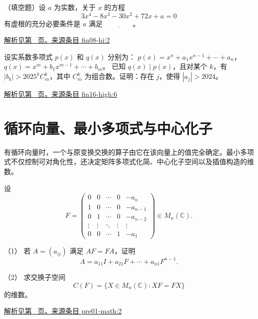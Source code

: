 \documentclass[UTF8,12pt,a4paper,fontset=fandol]{ctexart}
\begin{document}
\begin{example}\label{ex:fin08-hi:2}

（填空题）设 $a$ 为实数，关于 $x$ 的方程
\[
3x^{4}-8x^{3}-30x^{2}+72x+a=0
\]
有虚根的充分必要条件是 $a$ 满足 $\underline{\qquad\qquad}$。

\par\hyperref[ans:fin08-hi:2]{解析见第~\pageref{ans:fin08-hi:2} 页。}\quad\href{https://github.com/lzxcr/cmc-mathematics/blob/64916fa1fdbc3e444a652eca204d5669058ee321/src/problems/finals/08/02.md}{来源条目 fin08-hi:2}

\end{example}

\begin{example}\label{ex:fin16-high:6}

设实系数多项式 $p(x)$ 和 $q(x)$ 分别为：
$p(x) = x^n + a_1 x^{n-1} + \cdots + a_n$，$q(x) = x^m + b_1 x^{m-1} + \cdots + b_m$。
已知 $q(x) \mid p(x)$，且对某个 $k$，有 $|b_k| > 2025^k C_m^k$，其中 $C_m^k$ 为组合数。证明：存在 $j$，使得 $|a_j| > 2024$。

\par\hyperref[ans:fin16-high:6]{解析见第~\pageref{ans:fin16-high:6} 页。}\quad\href{https://github.com/lzxcr/cmc-mathematics/blob/64916fa1fdbc3e444a652eca204d5669058ee321/src/problems/finals/16/06.md}{来源条目 fin16-high:6}

\end{example}

\section{循环向量、最小多项式与中心化子}

\label{sec:questions-5}

有循环向量时，一个与原变换交换的算子由它在该向量上的值完全确定。最小多项式不仅控制可对角化性，还决定矩阵多项式化简、中心化子空间以及插值构造的维数。

\begin{example}\label{ex:pre01-math:2}

设
\[
F=\begin{pmatrix}
0&0&\cdots&0&-a_n\\
1&0&\cdots&0&-a_{n-1}\\
0&1&\cdots&0&-a_{n-2}\\
\vdots&\vdots&\ddots&\vdots&\vdots\\
0&0&\cdots&1&-a_1
\end{pmatrix}\in M_n(\mathbb C).
\]

（1） 若 $A=(a_{ij})$ 满足 $AF=FA$，证明
\[
A=a_{11}I+a_{21}F+\cdots+a_{n1}F^{n-1}.
\]

（2） 求交换子空间
\[
C(F)=\{X\in M_n(\mathbb C):XF=FX\}
\]
的维数。

\par\hyperref[ans:pre01-math:2]{解析见第~\pageref{ans:pre01-math:2} 页。}\quad\href{https://github.com/lzxcr/cmc-mathematics/blob/64916fa1fdbc3e444a652eca204d5669058ee321/src/problems/preliminary/01/02.md}{来源条目 pre01-math:2}

\end{example}
\end{document}
